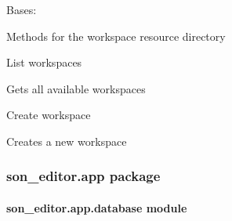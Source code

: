 \documentclass[letterpaper,10pt,english]{sphinxmanual}
\begin{document}

\begin{fulllineitems}
\label{_source/son_editor.apis:son_editor.apis.workspacesapi.Workspaces}
Bases: 

Methods for the workspace resource directory

\begin{fulllineitems}
\label{_source/son_editor.apis:son_editor.apis.workspacesapi.Workspaces.get}
List workspaces

Gets all available workspaces

\end{fulllineitems}


\begin{fulllineitems}
\label{_source/son_editor.apis:son_editor.apis.workspacesapi.Workspaces.methods}
\end{fulllineitems}


\begin{fulllineitems}
\label{_source/son_editor.apis:son_editor.apis.workspacesapi.Workspaces.post}
Create workspace

Creates a new workspace

\end{fulllineitems}


\end{fulllineitems}



\subsubsection{son\_editor.app package}
\label{_source/son_editor.app:son-editor-app-package}\label{_source/son_editor.app::doc}

\paragraph{son\_editor.app.database module}
\label{_source/son_editor.app:son-editor-app-database-module}\label{_source/son_editor.app:module-son_editor.app.database}
\end{document}
